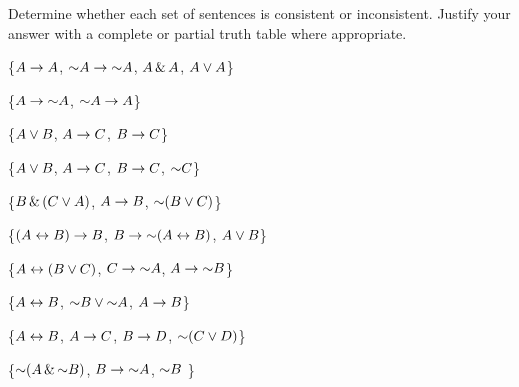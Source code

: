 \noindent\problempart
\label{pr.TT.consistent}
Determine whether each set of sentences is consistent or inconsistent. Justify your answer with a complete or partial truth table where appropriate.
\begin{earg}
\item \{$A\rightarrow A$, $\mathord{\sim} A \rightarrow \mathord{\sim} A$, $A\,\&\, A$, $A\vee A$\} \vspace{.5ex}%
\item \{$A \rightarrow \mathord{\sim} A$, $\mathord{\sim} A \rightarrow A$\}\vspace{.5ex}%
\item \{$A\vee B$, $A\rightarrow C$, $B\rightarrow C$\}\vspace{.5ex} %
\item \{$A \vee B$, $A \rightarrow C$, $B \rightarrow C$, $\mathord{\sim} C$\}\vspace{.5ex} %
\item \{$B\,\&\,(C\vee A)$, $A\rightarrow B$, $\mathord{\sim}(B\vee C)$\}\vspace{.5ex}  %
\item \{$(A \leftrightarrow B) \rightarrow B$,  $B \rightarrow \mathord{\sim} (A \leftrightarrow B)$, $A \vee B$\} \vspace{.5ex} %
\item \{$A\leftrightarrow(B\vee C)$, $C\rightarrow \mathord{\sim} A$, $A\rightarrow \mathord{\sim} B$\}\vspace{.5ex} %
\item  \{$A \leftrightarrow B$,  $\mathord{\sim} B \vee \mathord{\sim} A$,  $A \rightarrow  B$\} \vspace{.5ex}%
\item \{$A \leftrightarrow B$, $A \rightarrow C$, $B \rightarrow D$, $\mathord{\sim}(C \vee D)$\}\vspace{.5ex} %
\item \{$\mathord{\sim} (A \,\&\, \mathord{\sim} B)$,  $B \rightarrow \mathord{\sim} A$, $\mathord{\sim} B$ \} \vspace{.5ex} %

\end{earg}

